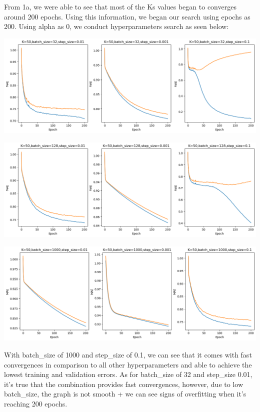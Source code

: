 \documentclass[a4paper]{article}
\begin{document}
From 1a, we were able to see that most of the Ks values began to converges
around 200 epochs. Using this information, we began our search using epochs as
200. Using alpha as 0, we conduct hyperparameters search as seen below:

\includegraphics[width=\textwidth]{../images/1b-k50-bs32.png}

\includegraphics[width=\textwidth]{../images/1b-k50-bs128.png}

\includegraphics[width=\textwidth]{../images/1b-k50-bs1000.png}

With batch\_size of 1000 and step\_size of 0.1, we can see that it comes with
fast convergences in comparison to all other hyperparameters and able to achieve
the lowest training and validation errors. As for batch\_size of 32 and
step\_size 0.01, it's true that the combination provides fast convergences,
however, due to low batch_size, the graph is not smooth + we can see signs of
overfitting when it's reaching 200 epochs.
\end{document}
